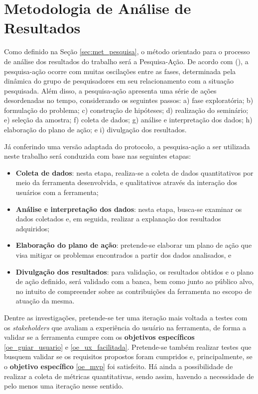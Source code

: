 \section{Metodologia de Análise de Resultados}

\label{sec:meto_analise_resultado}

Como definido na Seção \ref{sec:met_pesquisa}, o método orientado para o processo de análise dos resultados do trabalho será a Pesquisa-Ação. De acordo com  (\citeyear{gil2002elaborar}), a pesquisa-ação ocorre com muitas oscilações entre as fases, determinada pela dinâmica do grupo de pesquisadores em seu relacionamento com a situação pesquisada. Além disso, a pesquisa-ação apresenta uma série de ações desordenadas no tempo, considerando os seguintes passos: a) fase exploratória; b) formulação do problema; c) construção de hipóteses; d) realização do seminário; e) seleção da amostra; f) coleta de dados; g) análise e interpretação dos dados; h) elaboração do plano de ação; e i) divulgação dos resultados.

Já conferindo uma versão adaptada do protocolo, a pesquisa-ação a ser utilizada neste trabalho será conduzida com base nas seguintes etapas:

\begin{itemize}
    \item \textbf{Coleta de dados}: nesta etapa, realiza-se a coleta de dados quantitativos por meio da ferramenta desenvolvida, e qualitativos através da interação dos usuários com a ferramenta;
    \item \textbf{Análise e interpretação dos dados}: nesta etapa, busca-se examinar os dados coletados e, em seguida, realizar a explanação dos resultados adquiridos;
    \item \textbf{Elaboração do plano de ação}: pretende-se elaborar um plano de ação que visa mitigar os problemas encontrados a partir dos dados analisados, e 
    \item \textbf{Divulgação dos resultados}: para validação, os resultados obtidos e o plano de ação definido, será validado com a banca, bem como junto ao público alvo,
    no intuito de compreender sobre as contribuições da ferramenta no escopo de atuação da mesma.
\end{itemize}

Dentre as investigações, pretende-se ter uma iteração mais voltada a testes com os \textit{stakeholders} que avaliam a experiência do usuário na ferramenta, de forma a validar se a ferramenta cumpre com os \textbf{objetivos específicos} \ref{oe_guiar_usuario} e \ref{oe_ux_facilitada}. Pretende-se também realizar testes que busquem validar se os requisitos propostos foram cumpridos e, principalmente, se o \textbf{objetivo específico} \ref{oe_mvp} foi satisfeito. Há ainda a possibilidade de realizar a coleta de métricas quantitativas, sendo assim, havendo a necessidade de pelo menos uma iteração nesse sentido.

